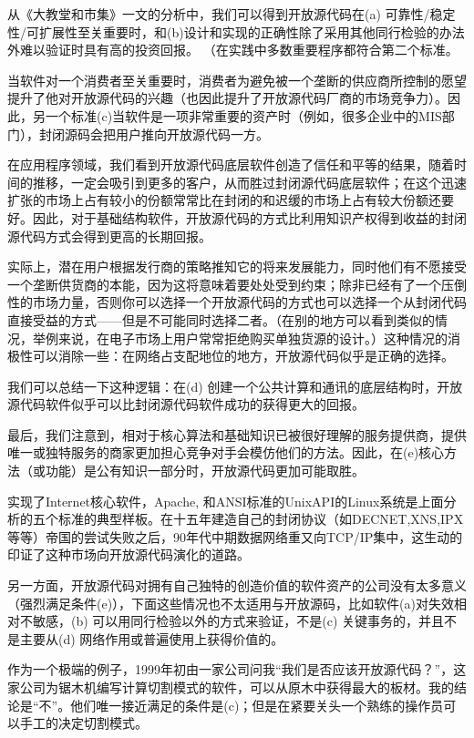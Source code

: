 \documentclass[a4paper,12pt,UTF8,twoside]{ctexbook}
\begin{document}
从《大教堂和市集》一文的分析中，我们可以得到开放源代码在(a) 可靠性/稳定性/可扩展性至关重要时，和(b)设计和实现的正确性除了采用其他同行检验的办法外难以验证时具有高的投资回报。 （在实践中多数重要程序都符合第二个标准。


当软件对一个消费者至关重要时，消费者为避免被一个垄断的供应商所控制的愿望提升了他对开放源代码的兴趣（也因此提升了开放源代码厂商的市场竞争力）。因此，另一个标准(c)当软件是一项非常重要的资产时（例如，很多企业中的MIS部门），封闭源码会把用户推向开放源代码一方。


在应用程序领域，我们看到开放源代码底层软件创造了信任和平等的结果，随着时间的推移，一定会吸引到更多的客户，从而胜过封闭源代码底层软件；在这个迅速扩张的市场上占有较小的份额常常比在封闭的和迟缓的市场上占有较大份额还要好。因此，对于基础结构软件，开放源代码的方式比利用知识产权得到收益的封闭源代码方式会得到更高的长期回报。


实际上，潜在用户根据发行商的策略推知它的将来发展能力，同时他们有不愿接受一个垄断供货商的本能，因为这将意味着要处处受到约束；除非已经有了一个压倒性的市场力量，否则你可以选择一个开放源代码的方式也可以选择一个从封闭代码直接受益的方式——但是不可能同时选择二者。（在别的地方可以看到类似的情况，举例来说，在电子市场上用户常常拒绝购买单独货源的设计。）这种情况的消极性可以消除一些：在网络占支配地位的地方，开放源代码似乎是正确的选择。


我们可以总结一下这种逻辑：在(d) 创建一个公共计算和通讯的底层结构时，开放源代码软件似乎可以比封闭源代码软件成功的获得更大的回报。


最后，我们注意到，相对于核心算法和基础知识已被很好理解的服务提供商，提供唯一或独特服务的商家更加担心竞争对手会模仿他们的方法。因此，在(e)核心方法（或功能）是公有知识一部分时，开放源代码更加可能取胜。


实现了Internet核心软件，Apache, 和ANSI标准的UnixAPI的Linux系统是上面分析的五个标准的典型样板。在十五年建造自己的封闭协议（如DECNET,XNS,IPX等等）帝国的尝试失败之后，90年代中期数据网络重又向TCP/IP集中，这生动的印证了这种市场向开放源代码演化的道路。


另一方面，开放源代码对拥有自己独特的创造价值的软件资产的公司没有太多意义（强烈满足条件(e)），下面这些情况也不太适用与开放源码，比如软件(a)对失效相对不敏感，(b) 可以用同行检验以外的方式来验证，不是(c) 关键事务的，并且不是主要从(d) 网络作用或普遍使用上获得价值的。


作为一个极端的例子，1999年初由一家公司问我“我们是否应该开放源代码？”，这家公司为锯木机编写计算切割模式的软件，可以从原木中获得最大的板材。我的结论是“不”。他们唯一接近满足的条件是(c)；但是在紧要关头一个熟练的操作员可以手工的决定切割模式。
\end{document}
